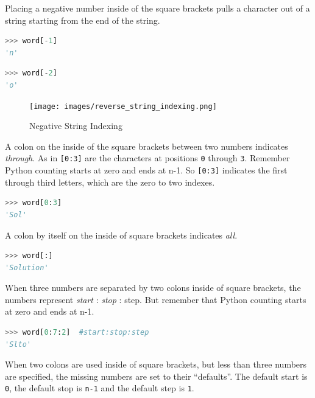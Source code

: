 \documentclass{book}
\begin{document}
    
        Placing a negative number inside of the square brackets pulls a
character out of a string starting from the end of the string.

\begin{lstlisting}[language=Python]
>>> word[-1]
'n'
\end{lstlisting}

\begin{lstlisting}[language=Python]
>>> word[-2]
'o'
\end{lstlisting}

\begin{figure}
\centering
\texttt{[image: images/reverse\_string\_indexing.png]}
\caption{Negative String Indexing}
\end{figure}
    




    
        A colon on the inside of the square brackets between two numbers
indicates \emph{through}. As in \lstinline![0:3]! are the characters at
positions \lstinline!0! through \lstinline!3!. Remember Python counting
starts at zero and ends at n-1. So \lstinline![0:3]! indicates the first
through third letters, which are the zero to two indexes.

\begin{lstlisting}[language=Python]
>>> word[0:3]
'Sol'
\end{lstlisting}
    




    
        A colon by itself on the inside of square brackets indicates \emph{all}.

\begin{lstlisting}[language=Python]
>>> word[:]
'Solution'
\end{lstlisting}
    




    
        When three numbers are separated by two colons inside of square
brackets, the numbers represent \emph{start} : \emph{stop} : step. But
remember that Python counting starts at zero and ends at n-1.

\begin{lstlisting}[language=Python]
>>> word[0:7:2]  #start:stop:step
'Slto'
\end{lstlisting}
    




    
        When two colons are used inside of square brackets, but less than three
numbers are specified, the missing numbers are set to their
``defaults''. The default start is \lstinline!0!, the default stop is
\lstinline!n-1! and the default step is \lstinline!1!.
\end{document}

